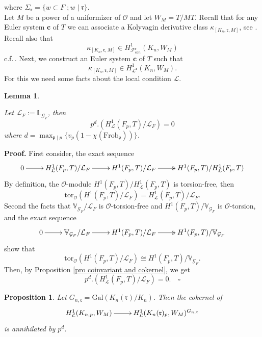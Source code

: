 \documentclass[reqno]{amsart}
\newcounter{dummy} \numberwithin{dummy}{section}
\newtheorem{lem}[dummy]{Lemma}
\newtheorem{pro}[dummy]{Proposition}
\begin{document}
where $\Sigma_{\mathfrak{r}}=\{w\subset F\;; w\mid
\mathfrak{r}\}.$\\
Let $M$ be a power of a uniformizer of $\mathcal{O}$ and let
$W_{M}=T/MT$. Recall that for any Euler system $\mathbf{c}$ of $T$
we can associate a Kolyvagin derivative class
$\kappa_{[K_{n},\mathfrak{r},M]}$, see \cite[\S 4.4]{Rubin00}.
Recall also that
$$
\kappa_{[K_{n},\mathfrak{r},M]}\in
H^{1}_{\mathcal{F}_{can}^{\mathfrak{r}}}(K_{n},W_{M})
$$
 c.f.\,\cite[Theorem 4.5.1]{Rubin00}. Next, we construct an Euler
system $\mathbf{c}$ of $T$ such that
$$
\kappa_{[K_{n},\mathfrak{r},M]}\in
H^{1}_{\mathcal{L}^{\mathfrak{r}}}(K_{n},W_{M}).
$$
For this we need some  facts about the local  condition
$\mathcal{L}$.
\begin{lem}\label{pd s local condition}

 Let
$\mathcal{L}_{F}:=\mathbb{L}_{\mathcal{G}_{F}}$, then
$$
p^{d}.(H^{1}_{\mathcal{L}}(F_{p},T)/\mathcal{L}_{F})=0
$$
where $d=\displaystyle{\max_{\mathfrak{p}\mid
p}}\{v_{p}(1-\chi(\mathrm{Frob}_{\mathfrak{p}}))\}$.
\end{lem}
\noindent \textbf{Proof.} First consider, the exact sequence
$$
\xymatrix@=2pc{0\ar[r]& H^{1}_{\mathcal{L}}(F_{p},T)/\mathcal{L}_{F}
\ar[r]& H^{1}(F_{p},T)/\mathcal{L}_{F}\ar@{->>}[r]&
H^{1}(F_{p},T)/H^{1}_{\mathcal{L}}(F_{p},T)}
$$
By definition, the $\mathcal{O}$-module
$H^{1}(F_{p},T)/H^{1}_{\mathcal{L}}(F_{p},T)$ is torsion-free, then
$$
\mathrm{tor}_{\mathcal{O}}(H^{1}(F_{p},T)/\mathcal{L}_{F})=
H^{1}_{\mathcal{L}}(F_{p},T)/\mathcal{L}_{F}.
$$
Second the facts that  $\mathbb{V}_{\mathcal{G}_{F}}
/\mathcal{L}_{F}$ is $\mathcal{O}$-torsion-free and
$H^{1}(F_{p},T)/\mathbb{V}_{\mathcal{G}_{F}}$ is
$\mathcal{O}$-torsion, and the exact sequence
$$
\xymatrix@=2pc{0\ar[r]& \mathbb{V}_{\mathcal{G}_{F}}
/\mathcal{L}_{F}\ar[r]& H^{1}(F_{p},T)/\mathcal{L}_{F}\ar@{->>}[r]&
H^{1}(F_{p},T)/\mathbb{V}_{\mathcal{G}_{F}}}
$$
show that
$$
 \mathrm{tor}_{\mathcal{O}}(H^{1}(F_{p},T)/\mathcal{L}_{F})\cong
 H^{1}(F_{p},T)/\mathbb{V}_{\mathcal{G}_{F}}.
$$
 Then, by Proposition \ref{pro coinvariant and cokernel}, we get
$$
p^{d}.(H^{1}_{\mathcal{L}}(F_{p},T)/\mathcal{L}_{F})=0. \quad
\square
$$
\begin{pro}\label{Pro Cokernel of WM and power of p}
 Let
$G_{n,\mathfrak{r}}=\mathrm{Gal}(K_{n}(\mathfrak{r})/K_{n})$. Then
the cokernel of
$$
\xymatrix@=2pc{ H^{1}_{\mathcal{L}}(K_{n,p},W_{M})\ar[r]&
H^{1}_{\mathcal{L}}(K_{n}(\mathfrak{r})_{p},W_{M})^{G_{n,\mathfrak{r}}}}
$$
is annihilated by $p^{d}$.
\end{pro}
\end{document}
